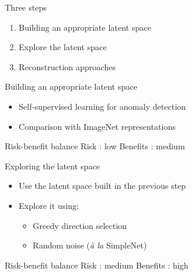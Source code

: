 \documentclass[xcolor=pdftex,dvipsnames,table,mathserif]{beamer}
\begin{document}
\begin{frame}{Three steps}

  \begin{enumerate}
  \item Building an appropriate latent space
  \item Explore the latent space
  \item Reconstruction approaches
  \end{enumerate}

\end{frame}

\begin{frame}{Building an appropriate latent space}

\begin{itemize}
\item Self-supervised learning for anomaly detection~\cite{langrognet_self-supervised_2025}
\item Comparison with ImageNet representations
\end{itemize}

\begin{block}{Risk-benefit balance}
  \hspace{4em} Risk : low \hspace{4em} Benefits : medium
\end{block}

\end{frame}

\begin{frame}{Exploring the latent space}

\begin{itemize}
   \item Use the latent space built in the previous step
   \item Explore it using:
     \begin{itemize}
     \item Greedy direction selection~\cite{gula_gaussian_2023}
     \item Random noise (\textit{à la} SimpleNet)
     \end{itemize}
\end{itemize}

\begin{block}{Risk-benefit balance}
  \hspace{4em} Risk : medium \hspace{4em} Benefits : high
\end{block}

\end{frame}
\end{document}
